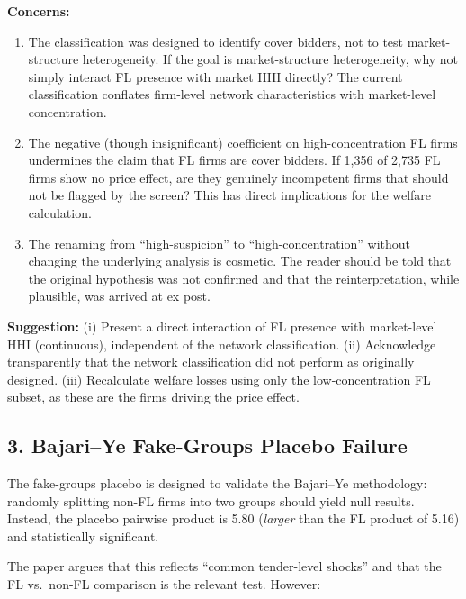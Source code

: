 \documentclass[12pt]{article}
\begin{document}
\noindent\textbf{Concerns:}
\begin{enumerate}[]
  \item The classification was designed to identify cover bidders, not to
    test market-structure heterogeneity. If the goal is market-structure
    heterogeneity, why not simply interact FL presence with market HHI
    directly? The current classification conflates firm-level network
    characteristics with market-level concentration.

  \item The negative (though insignificant) coefficient on
    high-concentration FL firms undermines the claim that FL firms are
    cover bidders. If 1,356 of 2,735 FL firms show no price effect, are
    they genuinely incompetent firms that should not be flagged by the
    screen? This has direct implications for the welfare calculation.

  \item The renaming from ``high-suspicion'' to ``high-concentration''
    without changing the underlying analysis is cosmetic. The reader
    should be told that the original hypothesis was not confirmed and
    that the reinterpretation, while plausible, was arrived at ex post.
\end{enumerate}

\noindent\textbf{Suggestion:} (i) Present a direct interaction of FL
presence with market-level HHI (continuous), independent of the network
classification. (ii) Acknowledge transparently that the network
classification did not perform as originally designed. (iii) Recalculate
welfare losses using only the low-concentration FL subset, as these are
the firms driving the price effect.

\subsection*{3. Bajari--Ye Fake-Groups Placebo Failure}

The fake-groups placebo is designed to validate the Bajari--Ye
methodology: randomly splitting non-FL firms into two groups should
yield null results. Instead, the placebo pairwise product is 5.80
(\emph{larger} than the FL product of 5.16) and statistically
significant.

The paper argues that this reflects ``common tender-level shocks'' and
that the FL vs.\ non-FL comparison is the relevant test. However:
\end{document}
